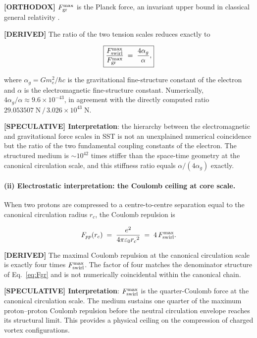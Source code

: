 \documentclass[11pt]{article}
\theoremstyle{definition}
\theoremstyle{plain}
\theoremstyle{remark}
\newcommand{\rc}{{r_c}}
\begin{document}
        \textbf{[ORTHODOX]} $F_{\rm gr}^{\max}$ is the Planck force, an invariant upper bound in classical general relativity \cite{Gibbons2002}.

        \textbf{[DERIVED]} The ratio of the two tension scales reduces exactly to

        \begin{align}
            \boxed{
            \frac{F_{\rm swirl}^{\max}}{F_{\rm gr}^{\max}}
            \;=\; \frac{4\alpha_g}{\alpha},
            }
            \label{eq:Fmax_ratio}
        \end{align}

        where $\alpha_g = Gm_e^2/\hbar c$ is the gravitational fine-structure constant of the electron and $\alpha$ is the electromagnetic fine-structure constant. Numerically, $4\alpha_g/\alpha \approx 9.6\times10^{-43}$, in agreement with the directly computed ratio $29.053507\;\text{N}\,/\,3.026\times10^{43}\;\text{N}$.

        \textbf{[SPECULATIVE] Interpretation}: the hierarchy between the electromagnetic and gravitational force scales in SST is not an unexplained numerical coincidence but the ratio of the two fundamental coupling constants of the electron. The structured medium is $\sim\!10^{42}$ times stiffer than the space-time geometry at the canonical circulation scale, and this stiffness ratio equals $\alpha/(4\alpha_g)$ exactly.

        \paragraph{(ii) Electrostatic interpretation: the Coulomb ceiling at core scale.}

        When two protons are compressed to a centre-to-centre separation equal to the canonical circulation radius $\rc$, the Coulomb repulsion is

        \begin{align}
            F_{pp}(\rc)
            \;=\; \frac{e^2}{4\pi\varepsilon_0 \rc^2}
            \;=\; 4\,F_{\rm swirl}^{\max}.
            \label{eq:Coulomb_core}
        \end{align}

        \textbf{[DERIVED]} The maximal Coulomb repulsion at the canonical circulation scale is exactly four times $F_{\rm swirl}^{\max}$. The factor of four matches the denominator structure of Eq.~\eqref{eq:Fgr} and is not numerically coincidental within the canonical chain.

        \textbf{[SPECULATIVE] Interpretation}: $F_{\rm swirl}^{\max}$ is the quarter-Coulomb force at the canonical circulation scale. The medium sustains one quarter of the maximum proton--proton Coulomb repulsion before the neutral circulation envelope reaches its structural limit. This provides a physical ceiling on the compression of charged vortex configurations.
\end{document}

